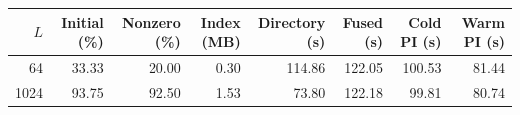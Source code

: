 \begin{tabular}{rrrrrrrr}\toprule
$L$ & Initial (\%) & Nonzero (\%) & Index (MB) & Directory (s) & Fused (s) & Cold PI (s) & Warm PI (s) \\
\midrule
64 & 33.33 & 20.00 & 0.30 & 114.86 & 122.05 & 100.53 & 81.44 \\
1024 & 93.75 & 92.50 & 1.53 & 73.80 & 122.18 & 99.81 & 80.74 \\
\bottomrule\end{tabular}
